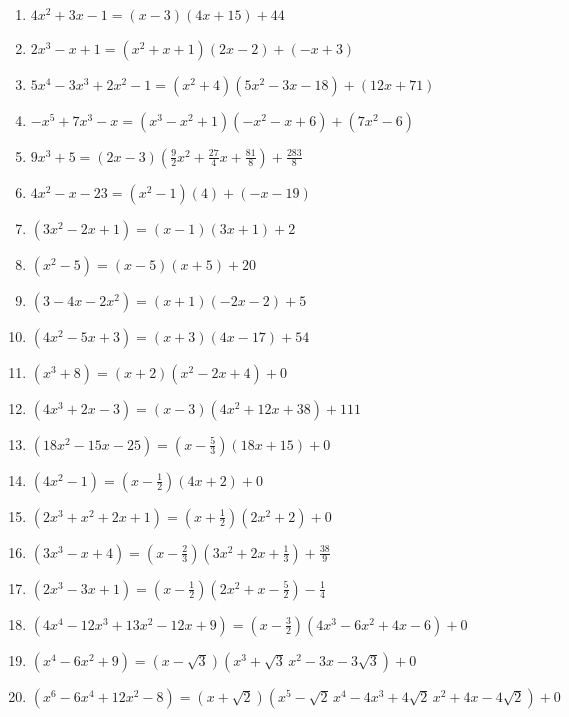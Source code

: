 \begin{enumerate}

\item $4x^2+3x-1 = (x-3)(4x+15) + 44$
\item $2x^3-x+1 = \left(x^2+x+1\right)(2x-2)+(-x+3)$
\item $5x^{4} - 3x^{3} + 2x^{2} - 1 = \left(x^{2} + 4 \right) \left(5x^{2} - 3x - 18 \right) + (12x + 71)$
\item $-x^{5} + 7x^{3} - x = \left(x^{3} - x^{2} + 1 \right) \left(-x^{2} - x + 6 \right) + \left(7x^{2} - 6 \right)$
\item $9x^{3} + 5 =(2x - 3) \left(\frac{9}{2}x^{2} + \frac{27}{4}x + \frac{81}{8} \right) + \frac{283}{8}$
\item $4x^2 - x - 23 = \left(x^{2} - 1 \right)(4) + (-x - 19)$


\item $\left(3x^2-2x+1 \right) = \left(x-1\right) (3x+1)+2$
\item $\left(x^2-5 \right)= \left(x-5\right)(x+5) + 20$


\item $\left(3-4x-2x^2 \right) = \left(x+1\right)(-2x-2)+5$
\item $\left(4x^2-5x +3\right) = \left(x+3\right)(4x-17)+54$


\item $\left(x^3 + 8 \right) = \left(x+2\right) \left(x^2-2x+4\right) + 0$
\item $\left(4x^3 +2x-3 \right) = \left(x -3\right) \left(4x^2+12x+38\right) + 111$


\item $\left(18x^2-15x-25\right) = \left(x - \frac{5}{3} \right)(18x+15)+0$
\item $\left(4x^2-1 \right) = \left(x - \frac{1}{2} \right)(4x+2)+0$


\item $\left(2x^3+x^2+2x+1 \right) = \left(x + \frac{1}{2} \right)\left(2x^2+2\right)+0$
\item $\left(3x^3 - x + 4 \right) = \left(x - \frac{2}{3} \right) \left(3x^2+2x+\frac{1}{3}\right) + \frac{38}{9}$


\item $\left(2x^3 - 3x +1 \right) = \left(x - \frac{1}{2} \right) \left(2x^2+x-\frac{5}{2}\right)-\frac{1}{4}$
\item $\left(4x^4-12x^3+13x^2 -12x+9\right) = \left(x - \frac{3}{2} \right) \left(4x^3-6x^2+4x-6 \right)+0$

\item $\left(x^4-6x^2+9 \right) = \left(x -\sqrt{3} \right) \left(x^3+\sqrt{3} \,x^2-3x-3\sqrt{3}\right) + 0$
\item $\left(x^6-6x^4+12x^2-8\right) = \left(x +\sqrt{2} \right) \left(x^5-\sqrt{2} \, x^4-4x^3+4\sqrt{2} \, x^2+4x-4\sqrt{2}\right) + 0$


\setcounter{HW}{\value{enumi}}
\end{enumerate}

